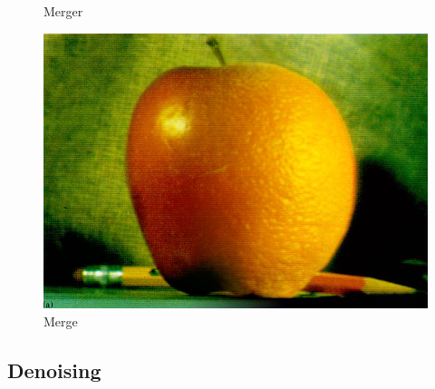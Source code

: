\documentclass{article}
\begin{document}
    \begin{figure}[!htb]
      \caption{Merger}
    \endminipage \hfill
      \includegraphics[scale=.3]{./blending/ao/final_3.png}
      \caption{Merge}
    \endminipage \hfill
    \end{figure}
    
    \phantom{}
    
    \pagebreak
    
    \subsection*{Denoising}
    
\end{document}
